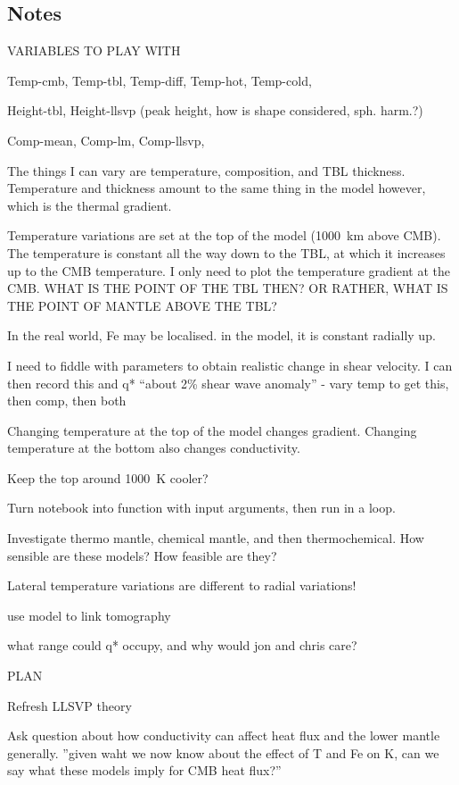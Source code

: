 \subsection{Notes}

VARIABLES TO PLAY WITH

Temp-cmb,
Temp-tbl,
Temp-diff,
Temp-hot,
Temp-cold,

Height-tbl,
Height-llsvp (peak height, how is shape considered, sph. harm.?)

Comp-mean,
Comp-lm,
Comp-llsvp,


The things I can vary are temperature, composition, and TBL thickness. Temperature and thickness amount to the same thing in the model however, which is the thermal gradient.

Temperature variations are set at the top of the model (1000~km above CMB). The temperature is constant all the way down to the TBL, at which it increases up to the CMB temperature. I only need to plot the temperature gradient at the CMB. WHAT IS THE POINT OF THE TBL THEN? OR RATHER, WHAT IS THE POINT OF MANTLE ABOVE THE TBL?

In the real world, Fe may be localised. in the model, it is constant radially up. 

I need to fiddle with parameters to obtain realistic change in shear velocity. I can then record this and q* ``about 2\% shear wave anomaly'' - vary temp to get this, then comp, then both

Changing temperature at the top of the model changes gradient. Changing temperature at the bottom also changes conductivity.

Keep the top around 1000~K cooler?

Turn notebook into function with input arguments, then run in a loop.

Investigate thermo mantle, chemical mantle, and then thermochemical. How sensible are these models? How feasible are they?

Lateral temperature variations are different to radial variations!

use model to link tomography

what range could q* occupy, and why would jon and chris care?




PLAN

Refresh LLSVP theory

Ask question about how conductivity can affect heat flux and the lower mantle generally. ''given waht we now know about the effect of T and Fe on K, can we say what these models imply for CMB heat flux?''

